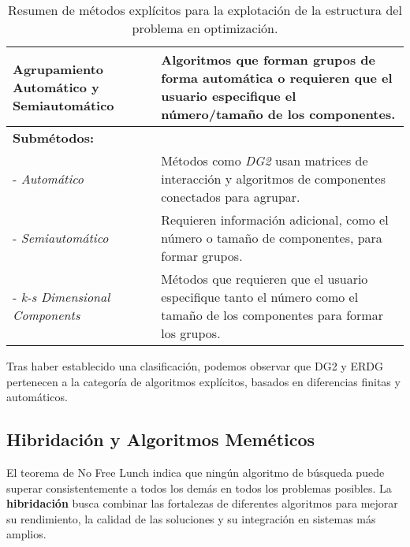 \begin{table}[H]
{\begin{tabular}{|l|p{12cm}|}
\textbf{Agrupamiento Automático y Semiautomático} & Algoritmos que forman grupos de forma automática o requieren que el usuario especifique el número/tamaño de los componentes. \\ \hline
\multicolumn{2}{|l|}{\textbf{Submétodos:}} \\ \hline
- \textit{Automático} & Métodos como \textit{DG2} usan matrices de interacción y algoritmos de componentes conectados para agrupar. \\ \hline
- \textit{Semiautomático} & Requieren información adicional, como el número o tamaño de componentes, para formar grupos. \\ \hline
- \textit{k-s Dimensional Components} & Métodos que requieren que el usuario especifique tanto el número como el tamaño de los componentes para formar los grupos. \\ \hline
\end{tabular}%
}
\caption{Resumen de métodos explícitos para la explotación de la estructura del problema en optimización.}
\label{tab:explicit_methods}
\end{table}

Tras haber establecido una clasificación, podemos observar que DG2 y ERDG pertenecen a la categoría de algoritmos explícitos, basados en diferencias finitas y automáticos.

\subsection*{Hibridación y Algoritmos Meméticos}

El teorema de No Free Lunch \cite{no_free_lunch} indica que ningún algoritmo de búsqueda puede superar consistentemente a todos los demás en todos los problemas posibles. La \textbf{hibridación} busca combinar las fortalezas de diferentes algoritmos para mejorar su rendimiento, la calidad de las soluciones y su integración en sistemas más amplios.

